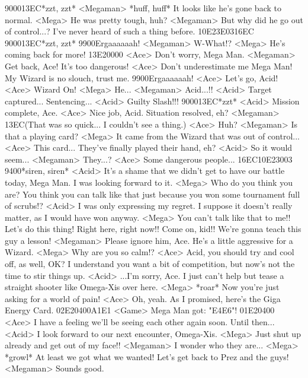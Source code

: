 {90}{00}{13}{EC}*zzt, zzt* 
<Megaman> *huff, huff* It looks like he's gone back to normal. 
<Mega> He was pretty tough, huh? 
<Megaman> But why did he go out of control...? 
I've never heard of such a thing before. 
{10}{E2}{3E}{03}{16}{EC} 
{90}{00}{13}{EC}*zzt, zzt* 
{99}{00}Ergaaaaaah! 
<Megaman> W-What!? 
<Mega> He's coming back for more! 
{13}{E2}{00}{00} 
<Ace> Don't worry, Mega Man. 
<Megaman> Get back, Ace! It's too dangerous! 
<Ace> Don't underestimate me Mega Man! 
My Wizard is no slouch, trust me. 
{99}{00}Ergaaaaaah! 
<Ace> Let's go, Acid! 
<Ace> Wizard On! 
<Mega> He... 
<Megaman> Acid...!! 
<Acid> Target captured... 
Sentencing... 
<Acid> Guilty Slash!!! 
{90}{00}{13}{EC}*zzt* 
<Acid> Mission complete, Ace. 
<Ace> Nice job, Acid. Situation resolved, eh? 
<Megaman> {13}{EC}(That was so quick...  I couldn't see a thing.) 
<Ace> Huh? 
<Megaman> Is that a playing card? 
<Mega> It came from the Wizard that was out of control... 
<Ace> This card... 
They've finally played their hand, eh? 
<Acid> So it would seem... 
<Megaman> They...? 
<Ace> Some dangerous people... 
{16}{EC}{10}{E2}{30}{03} 
{94}{00}*siren, siren* 
<Acid> It's a shame that we didn't get to have our battle today, Mega Man. 
I was looking forward to it. 
<Mega> Who do you think you are? 
You think you can talk like that just because you won 
some tournament full of scrubs!? 
<Acid> I was only expressing my regret. 
I suppose it doesn't really matter, as I would have won anyway. 
<Mega> You can't talk like that to me!! 
Let's do this thing! Right here, right now!! 
Come on, kid!! We're gonna teach this guy a lesson! 
<Megaman> Please ignore him, Ace. He's a little aggressive for a Wizard. 
<Mega> Why are you so calm!? 
<Ace> Acid, you should try and cool off, as well, OK? 
I understand you want a bit of competition, but 
now's not the time to stir things up. 
<Acid> ...I'm sorry, Ace. 
I just can't help but tease a straight shooter like Omega-Xis over here. 
<Mega> *roar* 
Now you're just asking for a world of pain! 
<Ace> Oh, yeah. As I promised, here's the Giga Energy Card. 
{02}{E2}{04}{00}{A1}{E1} 
<Game> Mega Man got: "{E4}{E6}"! 
{01}{E2}{04}{00} 
<Ace> I have a feeling we'll be seeing each other again soon. Until then... 
<Acid> I look forward to our next encounter, Omega-Xis. 
<Mega> Just shut up already and get out of my face!! 
<Megaman> I wonder who they are... 
<Mega> *growl* At least we got what we wanted! 
Let's get back to Prez and the guys! 
<Megaman> Sounds good. 
